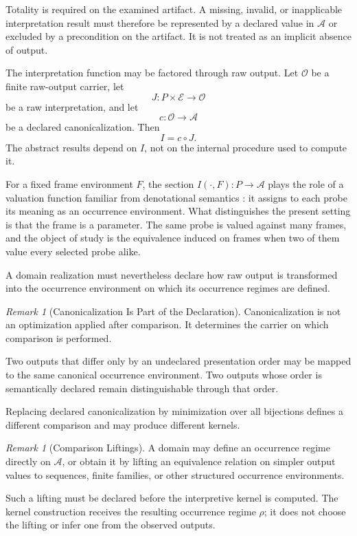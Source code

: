 \documentclass[11pt]{article}
\theoremstyle{plain}
\theoremstyle{definition}
\theoremstyle{remark}
\newtheorem{remark}[theorem]{Remark}
\begin{document}
Totality is required on the examined artifact.
A missing,
invalid,
or inapplicable interpretation result
must therefore be represented by a declared value in \(\mathcal{A}\)
or excluded by a precondition on the artifact.
It is not treated as an implicit absence of output.

The interpretation function may be factored through raw output.
Let \(\mathcal{O}\) be a finite raw-output carrier,
let
\[
  J:
  P\times\mathcal{E}
  \longrightarrow
  \mathcal{O}
\]
be a raw interpretation,
and let
\[
  c:
  \mathcal{O}
  \longrightarrow
  \mathcal{A}
\]
be a declared canonicalization.
Then
\[
  I
  =
  c\circ J.
\]
The abstract results depend on \(I\),
not on the internal procedure used to compute it.

For a fixed frame environment \(F\), the section
\(I({\cdot},F)\colon P \to \mathcal{A}\)
plays the role of a valuation function familiar from denotational semantics
\citep[\S4.1]{schmidt1986}:
it assigns to each probe its meaning as an occurrence environment.
What distinguishes the present setting is that the frame is a parameter.
The same probe is valued against many frames,
and the object of study is the equivalence induced on frames
when two of them value every selected probe alike.

A domain realization must nevertheless declare
how raw output is transformed into the occurrence environment
on which its occurrence regimes are defined.

\begin{remark}[Canonicalization Is Part of the Declaration]
  \label{ik.rem.canonicalization}
  Canonicalization is not an optimization applied after comparison.
  It determines the carrier on which comparison is performed.

  Two outputs that differ only by an undeclared presentation order
  may be mapped to the same canonical occurrence environment.
  Two outputs whose order is semantically declared
  remain distinguishable through that order.

  Replacing declared canonicalization
  by minimization over all bijections
  defines a different comparison
  and may produce different kernels.
\end{remark}

\begin{remark}[Comparison Liftings]
  \label{ik.rem.lifting}
  A domain may define an occurrence regime directly on \(\mathcal{A}\),
  or obtain it by lifting an equivalence relation
  on simpler output values
  to sequences,
  finite families,
  or other structured occurrence environments.

  Such a lifting must be declared before the interpretive kernel is computed.
  The kernel construction receives the resulting occurrence regime \(\rho\);
  it does not choose the lifting
  or infer one from the observed outputs.
\end{remark}
\end{document}
